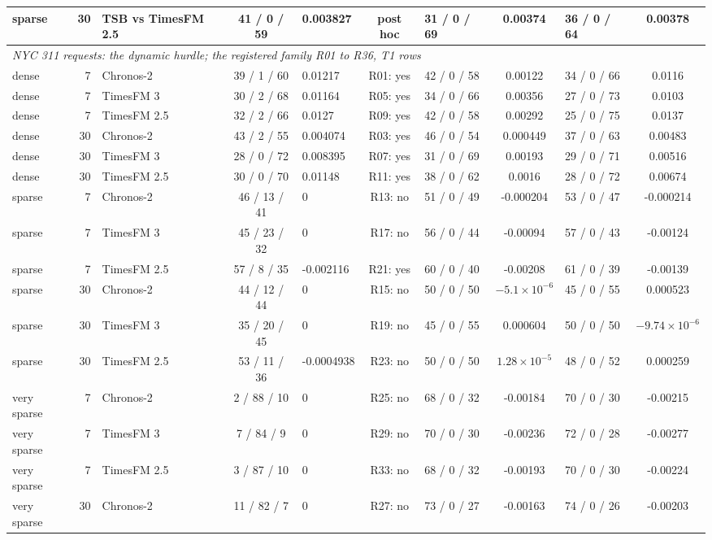 \begin{table}[p]
\begin{tabular}{lrlclclclc}
sparse & 30 & TSB vs TimesFM 2.5 & 41 / 0 / 59 & 0.003827 & post hoc & 31 / 0 / 69 & 0.00374 & 36 / 0 / 64 & 0.00378 \\
\midrule
\multicolumn{10}{l}{\emph{NYC 311 requests: the dynamic hurdle; the registered family R01 to R36, T1 rows}} \\
dense & 7 & Chronos-2 & 39 / 1 / 60 & 0.01217 & R01: yes & 42 / 0 / 58 & 0.00122 & 34 / 0 / 66 & 0.0116 \\
dense & 7 & TimesFM 3 & 30 / 2 / 68 & 0.01164 & R05: yes & 34 / 0 / 66 & 0.00356 & 27 / 0 / 73 & 0.0103 \\
dense & 7 & TimesFM 2.5 & 32 / 2 / 66 & 0.0127 & R09: yes & 42 / 0 / 58 & 0.00292 & 25 / 0 / 75 & 0.0137 \\
dense & 30 & Chronos-2 & 43 / 2 / 55 & 0.004074 & R03: yes & 46 / 0 / 54 & 0.000449 & 37 / 0 / 63 & 0.00483 \\
dense & 30 & TimesFM 3 & 28 / 0 / 72 & 0.008395 & R07: yes & 31 / 0 / 69 & 0.00193 & 29 / 0 / 71 & 0.00516 \\
dense & 30 & TimesFM 2.5 & 30 / 0 / 70 & 0.01148 & R11: yes & 38 / 0 / 62 & 0.0016 & 28 / 0 / 72 & 0.00674 \\
sparse & 7 & Chronos-2 & 46 / 13 / 41 & 0 & R13: no & 51 / 0 / 49 & -0.000204 & 53 / 0 / 47 & -0.000214 \\
sparse & 7 & TimesFM 3 & 45 / 23 / 32 & 0 & R17: no & 56 / 0 / 44 & -0.00094 & 57 / 0 / 43 & -0.00124 \\
sparse & 7 & TimesFM 2.5 & 57 / 8 / 35 & -0.002116 & R21: yes & 60 / 0 / 40 & -0.00208 & 61 / 0 / 39 & -0.00139 \\
sparse & 30 & Chronos-2 & 44 / 12 / 44 & 0 & R15: no & 50 / 0 / 50 & $-5.1 \times 10^{-6}$ & 45 / 0 / 55 & 0.000523 \\
sparse & 30 & TimesFM 3 & 35 / 20 / 45 & 0 & R19: no & 45 / 0 / 55 & 0.000604 & 50 / 0 / 50 & $-9.74 \times 10^{-6}$ \\
sparse & 30 & TimesFM 2.5 & 53 / 11 / 36 & -0.0004938 & R23: no & 50 / 0 / 50 & $1.28 \times 10^{-5}$ & 48 / 0 / 52 & 0.000259 \\
very sparse & 7 & Chronos-2 & 2 / 88 / 10 & 0 & R25: no & 68 / 0 / 32 & -0.00184 & 70 / 0 / 30 & -0.00215 \\
very sparse & 7 & TimesFM 3 & 7 / 84 / 9 & 0 & R29: no & 70 / 0 / 30 & -0.00236 & 72 / 0 / 28 & -0.00277 \\
very sparse & 7 & TimesFM 2.5 & 3 / 87 / 10 & 0 & R33: no & 68 / 0 / 32 & -0.00193 & 70 / 0 / 30 & -0.00224 \\
very sparse & 30 & Chronos-2 & 11 / 82 / 7 & 0 & R27: no & 73 / 0 / 27 & -0.00163 & 74 / 0 / 26 & -0.00203 \\

\end{tabular}
\end{table}
